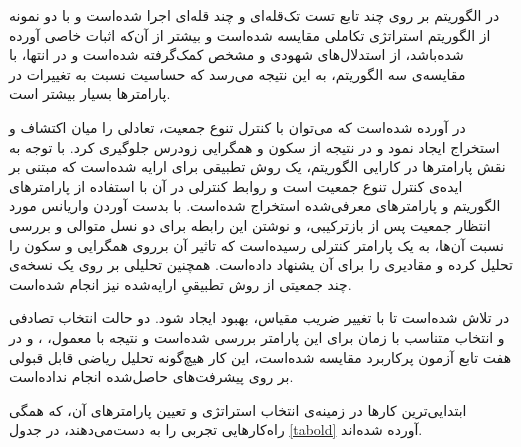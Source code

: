 \documentclass[12pt,a4paper]{article}
\theoremstyle{definition}
\theoremstyle{theorem}
\theoremstyle{definition}
\begin{document}
  در \cite{demon3} الگوریتم بر روی چند تابع تست تک‌قله‌ای و چند قله‌ای اجرا شده‌است و با دو نمونه از الگوریتم استراتژی تکاملی مقایسه‌ شده‌است و بیشتر از آن‌که اثبات خاصی آورده شده‌باشد، از استدلال‌های شهودی و مشخص کمک‌گرفته شده‌است و در انتها، با مقایسه‌ی سه الگوریتم، به این نتیجه می‌رسد که حساسیت  نسبت به تغییرات در پارامترها بسیار بیشتر است. 
  
  در \cite{demon4} آورده شده‌است که می‌توان با کنترل تنوع جمعیت، تعادلی را میان اکتشاف و استخراج ایجاد نمود و در نتیجه از سکون و همگرایی زودرس جلوگیری کرد. با توجه به نقش پارامترها در کارایی الگوریتم، یک روش تطبیقی برای  ارایه شده‌است که مبتنی بر ایده‌ی کنترل تنوع جمعیت است و روابط کنترلی در آن با استفاده از پارامترهای الگوریتم و پارامترهای معرفی‌شده استخراج شده‌است. با بدست آوردن واریانس مورد انتظار جمعیت پس از بازترکیبی، و نوشتن این رابطه برای دو نسل متوالی و بررسی نسبت آن‌ها، به یک پارامتر کنترلی رسیده‌است که تاثیر آن برروی همگرایی و سکون را تحلیل کرده و مقادیری را برای آن یشنهاد داده‌است. همچنین تحلیلی بر روی یک نسخه‌ی چند جمعیتی از روش تطبیقیِ ارایه‌شده نیز انجام شده‌است. 
  
  در \cite{demon5} تلاش‌ شده‌است تا با تغییر ضریب مقیاس، بهبود ایجاد شود. دو حالت انتخاب تصادفی و انتخاب متناسب با زمان برای این پارامتر بررسی شده‌است و نتیجه‌ با 
  معمول، 
  \cite{pso}،
  \cite{pso-tviw}
  و 
    \cite{pso-randiw}
    در هفت تابع ‌آزمون پرکاربرد مقایسه شده‌است، این کار هیچ‌گونه تحلیل ریاضی قابل قبولی بر روی پیشرفت‌های حاصل‌شده انجام نداده‌است.
    
    ابتدایی‌ترین کارها در زمینه‌ی انتخاب استراتژی و تعیین پارامترهای آن، که همگی راه‌کارهایی تجربی را به دست‌می‌دهند، در جدول 
    \ref{tabold}
    آورده‌ شده‌اند. 


\renewcommand{\arraystretch}{2}
\end{document}
